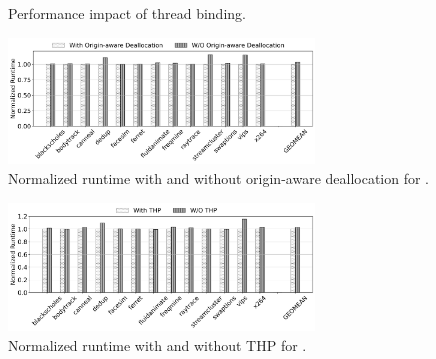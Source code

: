 \begin{figure}[!h]
\centering
{}

\caption{Performance impact of thread binding.}
\label{binding-pthread-scalibity}
\end{figure}


\begin{figure}[!ht]
    \centering
    \includegraphics[width=3.2in]{figure/origin-aware.jpg}
    \caption{Normalized runtime with and without origin-aware deallocation for \NM{}.  \label{fig:origin}}
\end{figure}

\begin{figure}[!ht]
    \centering
    \includegraphics[width=3.2in]{figure/hugepage.jpg}
    \caption{Normalized runtime with and without THP for \NM{}.  \label{fig:hugepage}}
\end{figure}

